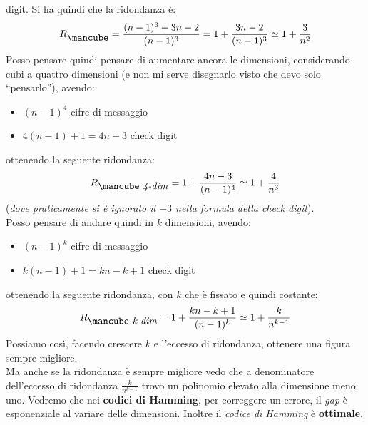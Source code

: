 \documentclass[a4paper,12pt, oneside]{book}
\begin{document}
digit. Si ha quindi che la ridondanza è:
\[R_{\mbox{\mancube}}=\frac{(n-1)^3+3n-2}{(n-1)^3}=1+\frac{3n-2}{(n-1)^3}
  \simeq 1+\frac{3}{n^2}\]
Posso pensare quindi pensare di aumentare ancora le dimensioni, considerando
cubi a quattro dimensioni (e non mi serve disegnarlo visto che devo solo
``pensarlo''), avendo: 
\begin{itemize}
  \item $(n-1)^4$ cifre di messaggio 
  \item $4(n-1)+1=4n-3$ check digit
\end{itemize}
ottenendo la seguente ridondanza:
\[R_{\mbox{\mancube  \textit{4-dim}}}=1+\frac{4n-3}{(n-1)^4}\simeq
  1+\frac{4}{n^3}\]
(\textit{dove praticamente si è ignorato il $-3$ nella formula della check
  digit}).\\ 
Posso pensare di andare quindi in $k$ dimensioni, avendo:
\begin{itemize}
  \item $(n-1)^k$ cifre di messaggio 
  \item $k(n-1)+1=kn-k+1$ check digit
\end{itemize}
ottenendo la seguente ridondanza, con $k$ che è fissato e quindi costante:
\[R_{\mbox{\mancube  \textit{k-dim}}}=1+\frac{kn-k+1}{(n-1)^k}\simeq
  1+\frac{k}{n^{k-1}}\]
Possiamo così, facendo crescere $k$ e l'eccesso di ridondanza, ottenere una
figura sempre migliore.\\
Ma anche se la ridondanza è sempre migliore vedo che a denominatore dell'eccesso
di ridondanza $\frac{k}{n^{k-1}}$ trovo un polinomio elevato alla dimensione
meno uno. Vedremo che nei \textbf{codici di Hamming}, per correggere un errore,
il \textit{gap} è esponenziale al variare delle dimensioni. Inoltre il
\textit{codice di Hamming} è \textbf{ottimale}.
\end{document}
